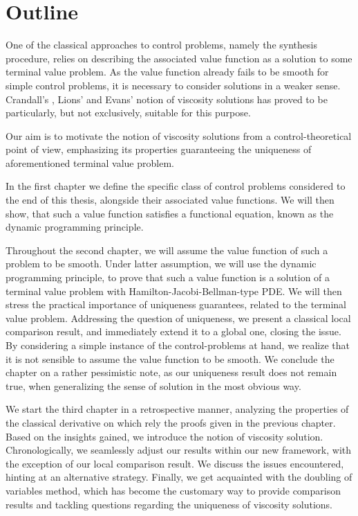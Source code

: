 \chapter*{Outline}

One of the classical approaches to control problems, namely the synthesis procedure, relies on describing the associated value function as a solution to some terminal value problem. As the value function already fails to be smooth for simple control problems, it is necessary to consider solutions in a weaker sense.
Crandall's \cite{lions}, Lions' \cite{lions1982fully, lions1982generalized} and Evans' \cite{crandall1984some} notion of viscosity solutions has proved to be particularly, but not exclusively, suitable for this purpose.

Our aim is to motivate the notion of viscosity solutions from a control-theoretical point of view, emphasizing its properties guaranteeing the uniqueness of aforementioned terminal value problem. 

In the first chapter we define the specific class of control problems considered to the end of this thesis, alongside their associated value functions. We will then show, that such a value function satisfies a functional equation, known as the dynamic programming principle.

Throughout the second chapter, we will assume the value function of such a problem to be smooth. Under latter assumption, we will use the dynamic programming principle, to prove that such a value function is a solution of a terminal value problem with Hamilton-Jacobi-Bellman-type PDE. We will then stress the practical importance of uniqueness guarantees, related to the terminal value problem. Addressing the question of uniqueness, we present a classical local comparison result, and immediately extend it to a global one, closing the issue. By considering a simple instance of the control-problems at hand, we realize that it is not sensible to assume the value function to be smooth. We conclude the chapter on a rather pessimistic note, as our uniqueness result does not remain true, when generalizing the sense of solution in the most obvious way.

We start the third chapter in a retrospective manner, analyzing the properties of the classical derivative on which rely the proofs given in the previous chapter. Based on the insights gained, we introduce the notion of viscosity solution. Chronologically, we seamlessly adjust our results within our new framework, with the exception of our local comparison result. We discuss the issues encountered, hinting at an alternative strategy. Finally, we get acquainted with the doubling of variables method, which has become the customary way to provide comparison results and tackling questions regarding the uniqueness of viscosity solutions.

